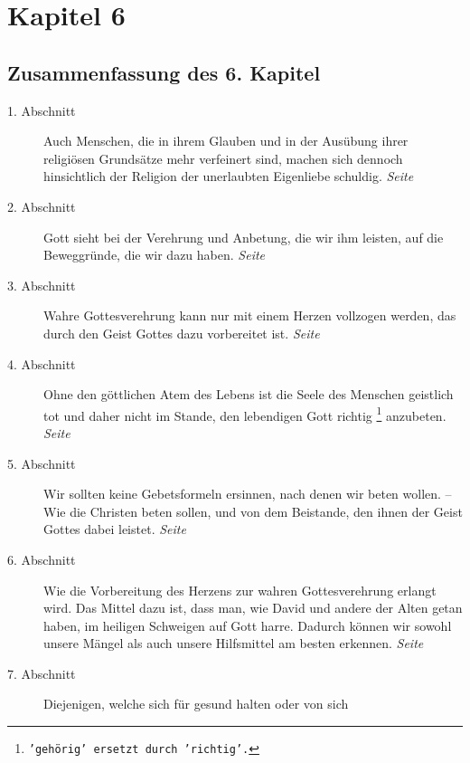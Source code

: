 

\chapter{Kapitel 6} \label{kap6}

\section{Zusammenfassung des 6. Kapitel}

\begin{description}
\item[1. Abschnitt] Auch Menschen, die in ihrem Glauben und in der Ausübung
ihrer religiösen Grundsätze mehr verfeinert sind, machen sich dennoch
hinsichtlich der Religion der unerlaubten Eigenliebe schuldig.
\dotfill \textit{Seite~\pageref{kap6_ab1}}\\
\item[2. Abschnitt] Gott sieht bei der Verehrung und Anbetung, die wir ihm
leisten, auf die Beweggründe, die wir dazu haben.
\dotfill \textit{Seite~\pageref{kap6_ab2}}\\
\item[3. Abschnitt] Wahre Gottesverehrung kann nur mit einem Herzen vollzogen
werden, das durch den Geist Gottes dazu vorbereitet ist.
\dotfill \textit{Seite~\pageref{kap6_ab3}}\\
\item[4. Abschnitt] Ohne den göttlichen Atem des Lebens ist die Seele des
Menschen geistlich tot und daher nicht im Stande, den lebendigen Gott richtig
\footnote{\texttt{'gehörig' ersetzt durch 'richtig'.}}
anzubeten.
\dotfill \textit{Seite~\pageref{kap6_ab4}}\\
\item[5. Abschnitt] Wir sollten keine Gebetsformeln ersinnen, nach denen wir
beten wollen. -- Wie die Christen beten sollen, und von dem Beistande, den ihnen
der Geist Gottes dabei leistet.
\dotfill \textit{Seite~\pageref{kap6_ab5}}\\
\item[6. Abschnitt] Wie die Vorbereitung des Herzens zur wahren Gottesverehrung
erlangt wird. Das Mittel dazu ist, dass man, wie David und andere der Alten
getan haben, im heiligen Schweigen auf Gott harre. Dadurch können wir sowohl
unsere Mängel als auch unsere Hilfsmittel am besten erkennen.
\dotfill \textit{Seite~\pageref{kap6_ab6}}\\
\item[7. Abschnitt] Diejenigen, welche sich für gesund halten oder von sich

\end{description}
